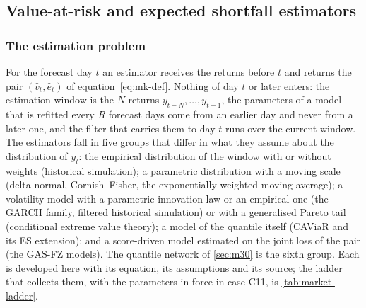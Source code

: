 \subsection{Value-at-risk and expected shortfall estimators}
\label{sec:m18}

\subsubsection{The estimation problem}
For the forecast day $t$ an estimator receives the returns before $t$ and returns the pair $(\widehat v_t,\widehat e_t)$ of
equation~\eqref{eq:mk-def}. Nothing of day $t$ or later enters: the estimation window is the $N$ returns $y_{t-N},\dots,y_{t-1}$, the
parameters of a model that is refitted every $R$ forecast days come from an earlier day and never from a later one, and the filter
that carries them to day $t$ runs over the current window. The estimators fall in five groups that differ in what they assume about
the distribution of $y_t$: the empirical distribution of the window with or without weights (historical simulation); a parametric
distribution with a moving scale (delta-normal, Cornish--Fisher, the exponentially weighted moving average); a volatility model with a
parametric innovation law or an empirical one (the GARCH family, filtered historical simulation) or with a generalised Pareto tail
(conditional extreme value theory); a model of the quantile itself (CAViaR and its ES extension); and a score-driven model estimated
on the joint loss of the pair (the GAS-FZ models). The quantile network of \cref{sec:m30} is the sixth group. Each is developed here
with its equation, its assumptions and its source; the ladder that collects them, with the parameters in force in case C11, is
\cref{tab:market-ladder}.



